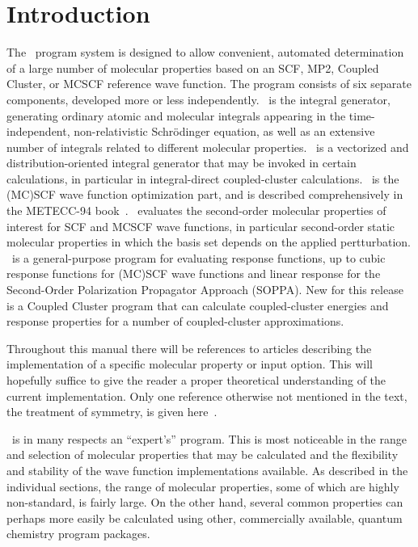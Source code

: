 \chapter{Introduction}\label{ch:intro}

          The \siraba\ program system is designed to allow
convenient, automated determination of a large number of molecular
properties based on an SCF, MP2, Coupled Cluster, or MCSCF reference wave function.
 The program consists
of six separate components, developed more or less independently.
\her\ is the integral generator, generating ordinary
atomic and molecular integrals appearing
in the time-independent, non-relativistic Schr\"{o}dinger
equation, as well as an extensive number of integrals related to
different molecular properties. \eri\ is a vectorized and
distribution-oriented integral generator that may be invoked in
certain calculations, in particular in integral-direct coupled-cluster
calculations. \sir\ is the (MC)SCF wave function 
optimization part, and is described comprehensively in the
METECC-94 book~\cite{hjajhajomotecc}. \aba\ evaluates the
second-order molecular properties of interest for SCF and MCSCF wave
functions, in particular second-order static molecular properties in
which the basis set depends on the applied pertturbation. \resp\ is a general-purpose
program for evaluating response functions, up to cubic response
functions for (MC)SCF wave functions and linear response for the
Second-Order Polarization Propagator Approach (SOPPA). New for this
release is a Coupled Cluster program that can calculate
coupled-cluster energies and response properties for a number of
coupled-cluster approximations. 

Throughout this manual there will be references to articles
describing the implementation of a specific molecular property or
input option. This will hopefully suffice to give the reader a proper
theoretical understanding of the current implementation. Only one
reference otherwise not mentioned in the text, the treatment of
symmetry, is given here~\cite{prttca69}.

\siraba\ is in many respects an ``expert's'' program. This is most
noticeable in the range and selection of molecular properties that may
be calculated and the flexibility and stability of the wave function
implementations available. As described in the individual sections, the range of
molecular properties, some of which are highly non-standard, is fairly
large. On the other hand, several common properties can perhaps more
easily be calculated using other, commercially available, quantum
chemistry program packages.

